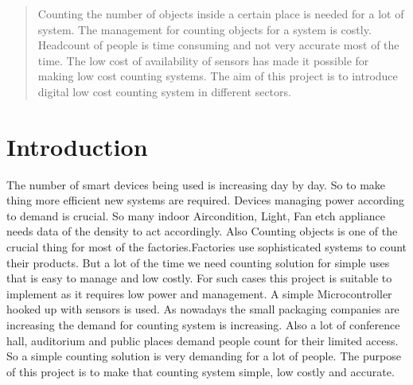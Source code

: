 \documentclass[conference]{IEEEtran}
\begin{document}
\maketitle

\begin{abstract}Counting the number of objects inside a certain place is needed for a lot of system. The management for counting objects for a system  is costly. Headcount of people is time consuming and not very accurate most of the time. The low cost of availability of sensors  has made it possible for making low cost counting systems. The aim of this project is to introduce digital low cost counting system in different sectors.

\end{abstract}





%
\IEEEpeerreviewmaketitle



\section{Introduction}

The number of smart devices being used is increasing day by day. So to make thing more efficient new systems are required. Devices managing power according to demand is crucial. So many indoor Aircondition, Light, Fan etch appliance needs data of the density to act accordingly. Also Counting objects is one of the crucial thing for most of the factories.Factories use sophisticated systems to count their products. But a lot of the time we need counting solution for simple uses that is easy to manage and low costly. For such cases this project is suitable to implement as it requires low power and management. A simple Microcontroller hooked up with sensors is used. As nowadays the small packaging companies are increasing the demand for counting system is increasing. Also a lot of conference hall, auditorium and public places demand people count for their limited access. So a simple counting solution is very demanding for a lot of people. The purpose of this project is to make that counting system simple, low costly and  accurate.
\end{document}
